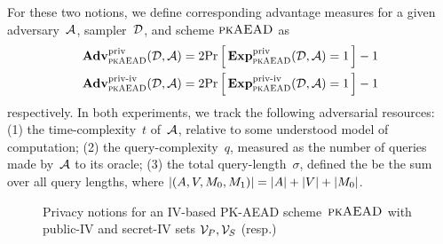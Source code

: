 For these two notions, we define corresponding advantage measures for a given adversary~${\cal A}$, sampler~${\cal D}$, and scheme $\textsc{pkAEAD}$ as
\begin{align*}
\mathbf{Adv}^{\mathrm{priv}}_{\textsc{pkAEAD}}{({\cal D},{\cal A})}&=2{\Pr\left[\,{\mathbf{Exp}^{\mathrm{priv}}_{\textsc{pkAEAD}}{({\cal D},{\cal A})}=1}\,\right]}-1\\ \mathbf{Adv}^{\mathrm{priv\textnormal{-}iv}}_{\textsc{pkAEAD}}{({\cal D},{\cal A})}&=2{\Pr\left[\,{\mathbf{Exp}^{\mathrm{priv\textnormal{-}iv}}_{\textsc{pkAEAD}}{({\cal D},{\cal A})}=1}\,\right]}-1
\end{align*}
respectively.  In both experiments, we track the following adversarial resources: (1) the time-complexity~$t$ of~${\cal A}$, relative to some understood model of computation; (2) the query-complexity~$q$, measured as the number of queries made by~${\cal A}$ to its oracle; (3) the total query-length~$\sigma$, defined the be the sum over all query lengths, where $|(A,V,M_0,M_1)|=|A|+|V|+|M_0|$.
\begin{figure}
\begin{center}
\caption{Privacy notions for an IV-based PK-AEAD scheme~$\textsc{pkAEAD}$ with public-IV and secret-IV sets $\mathcal{V}_P,\mathcal{V}_S$ (resp.)}
\label{fig:ind-cda}
\end{center}
\end{figure}


\fi
